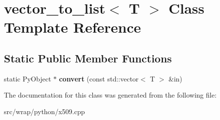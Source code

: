 \hypertarget{classvector__to__list}{\section{vector\-\_\-to\-\_\-list$<$ T $>$ Class Template Reference}
\label{classvector__to__list}
}
\subsection*{Static Public Member Functions}
\begin{DoxyCompactItemize}
\item 
\hypertarget{classvector__to__list_ab92cc8489f0ddf9477ac864ca41fbd4d}{static Py\-Object $\ast$ {\bfseries convert} (const std\-::vector$<$ T $>$ \&in)}\label{classvector__to__list_ab92cc8489f0ddf9477ac864ca41fbd4d}

\end{DoxyCompactItemize}


The documentation for this class was generated from the following file\-:\begin{DoxyCompactItemize}
\item 
src/wrap/python/x509.\-cpp\end{DoxyCompactItemize}

